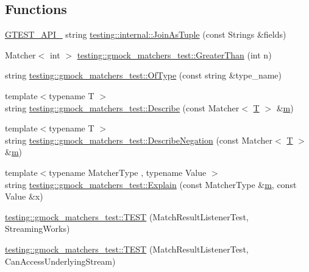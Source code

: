 \subsection*{Functions}
\begin{DoxyCompactItemize}
\item 
\hyperlink{gtest-port_8h_aa73be6f0ba4a7456180a94904ce17790}{G\+T\+E\+S\+T\+\_\+\+A\+P\+I\+\_\+} string \hyperlink{namespacetesting_1_1internal_a61d60981533cb0875bad9025e0d98b74}{testing\+::internal\+::\+Join\+As\+Tuple} (const Strings \&fields)
\item 
Matcher$<$ int $>$ \hyperlink{namespacetesting_1_1gmock__matchers__test_a8cf8614a7c9adc8fb00e8af04895f97c}{testing\+::gmock\+\_\+matchers\+\_\+test\+::\+Greater\+Than} (int n)
\item 
string \hyperlink{namespacetesting_1_1gmock__matchers__test_a5d48d2ef7ca374de369c5f0a30e32343}{testing\+::gmock\+\_\+matchers\+\_\+test\+::\+Of\+Type} (const string \&type\+\_\+name)
\item 
{\footnotesize template$<$typename T $>$ }\\string \hyperlink{namespacetesting_1_1gmock__matchers__test_a36ae44e4f6c8e9fe3fe9162132503717}{testing\+::gmock\+\_\+matchers\+\_\+test\+::\+Describe} (const Matcher$<$ \hyperlink{functions__7_8js_adf1f3edb9115acb0a1e04209b7a9937b}{T} $>$ \&\hyperlink{variables__e_8js_aab4247b6acebcba996939b177f483c14}{m})
\item 
{\footnotesize template$<$typename T $>$ }\\string \hyperlink{namespacetesting_1_1gmock__matchers__test_afbc8022da5a58aa467ec414ab3e90908}{testing\+::gmock\+\_\+matchers\+\_\+test\+::\+Describe\+Negation} (const Matcher$<$ \hyperlink{functions__7_8js_adf1f3edb9115acb0a1e04209b7a9937b}{T} $>$ \&\hyperlink{variables__e_8js_aab4247b6acebcba996939b177f483c14}{m})
\item 
{\footnotesize template$<$typename Matcher\+Type , typename Value $>$ }\\string \hyperlink{namespacetesting_1_1gmock__matchers__test_a6215aeb6213a03f4233924ef1c74d968}{testing\+::gmock\+\_\+matchers\+\_\+test\+::\+Explain} (const Matcher\+Type \&\hyperlink{variables__e_8js_aab4247b6acebcba996939b177f483c14}{m}, const Value \&x)
\item 
\hyperlink{namespacetesting_1_1gmock__matchers__test_a7bc21ec910c3861034d1336fecfcc260}{testing\+::gmock\+\_\+matchers\+\_\+test\+::\+T\+E\+ST} (Match\+Result\+Listener\+Test, Streaming\+Works)
\item 
\hyperlink{namespacetesting_1_1gmock__matchers__test_abc02b215e80c57464c83abdf297b9db7}{testing\+::gmock\+\_\+matchers\+\_\+test\+::\+T\+E\+ST} (Match\+Result\+Listener\+Test, Can\+Access\+Underlying\+Stream)

\end{DoxyCompactItemize}
